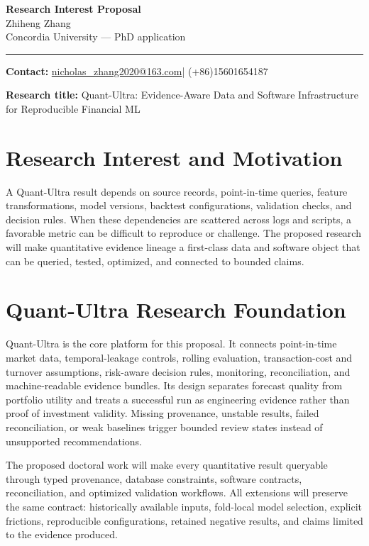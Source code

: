 \documentclass[11pt]{article}
\makeatletter
\newcommand{\ApplicantName}{Zhiheng Zhang}
\newcommand{\ApplicantEmail}{\href{mailto:nicholas_zhang2020@163.com}{nicholas\_zhang2020@163.com}}
\newcommand{\ApplicantPhone}{(+86)15601654187}
\makeatother
\begin{document}
\begin{center}
{\LARGE\bfseries Research Interest Proposal}\\[0.25em]
{\large \ApplicantName}\\
Concordia University --- PhD application
\end{center}
\vspace{0.35em}\hrule\vspace{0.65em}

\setlength{\parskip}{0.45em}
\textbf{Contact:} \ApplicantEmail\quad | \quad \ApplicantPhone

\textbf{Research title:} Quant-Ultra: Evidence-Aware Data and Software Infrastructure for Reproducible Financial ML

\section*{Research Interest and Motivation}
A Quant-Ultra result depends on source records, point-in-time queries, feature transformations, model versions, backtest configurations, validation checks, and decision rules. When these dependencies are scattered across logs and scripts, a favorable metric can be difficult to reproduce or challenge. The proposed research will make quantitative evidence lineage a first-class data and software object that can be queried, tested, optimized, and connected to bounded claims.

\section*{Quant-Ultra Research Foundation}
Quant-Ultra is the core platform for this proposal. It connects point-in-time market data, temporal-leakage controls, rolling evaluation, transaction-cost and turnover assumptions, risk-aware decision rules, monitoring, reconciliation, and machine-readable evidence bundles. Its design separates forecast quality from portfolio utility and treats a successful run as engineering evidence rather than proof of investment validity. Missing provenance, unstable results, failed reconciliation, or weak baselines trigger bounded review states instead of unsupported recommendations.

The proposed doctoral work will make every quantitative result queryable through typed provenance, database constraints, software contracts, reconciliation, and optimized validation workflows. All extensions will preserve the same contract: historically available inputs, fold-local model selection, explicit frictions, reproducible configurations, retained negative results, and claims limited to the evidence produced.
\end{document}
